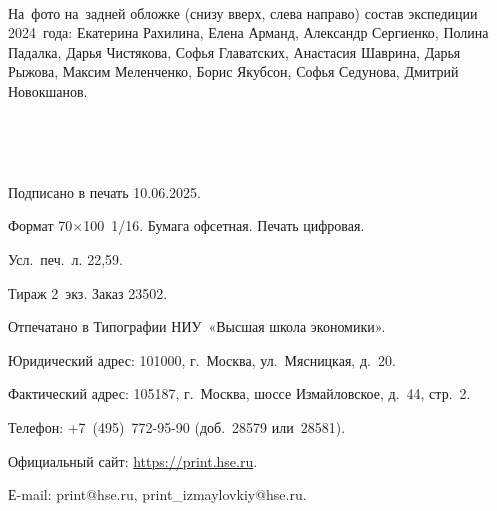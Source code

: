 \clearpage
\thispagestyle{empty}

~\\

\vfill

{\setlength{\parindent}{0cm}
На~фото на~задней обложке (снизу вверх, слева направо) состав экспедиции 2024~года: Екатерина Рахилина, Елена Арманд, Александр Сергиенко, Полина Падалка, Дарья Чистякова, Софья Главатских, Анастасия Шаврина, Дарья Рыжова, Максим Меленченко, Борис Якубсон, Софья Седунова, Дмитрий Новокшанов.
}

\bigskip

~\\

\pagebreak

\clearpage
\thispagestyle{empty}

{\setlength{\parindent}{0cm}

~\\

\vfill

{

Подписано в печать 10.06.2025.

Формат 70×100~1/16. Бумага офсетная. Печать цифровая.

Усл.~печ.~л. 22,59.

Тираж 2~экз. Заказ 23502.

Отпечатано в Типографии НИУ~«Высшая школа экономики».

Юридический адрес: 101000, г.~Москва, ул.~Мясницкая, д.~20.

Фактический адрес: 105187, г.~Москва, шоссе Измайловское, д.~44, стр.~2.

Телефон: +7~(495)~772-95-90 (доб.~28579 или~28581).

Официальный сайт: \href{https://print.hse.ru}{https://print.hse.ru}.

Е-mail: print@hse.ru, print\_izmaylovkiy@hse.ru.

}

\bigskip

~\\
}